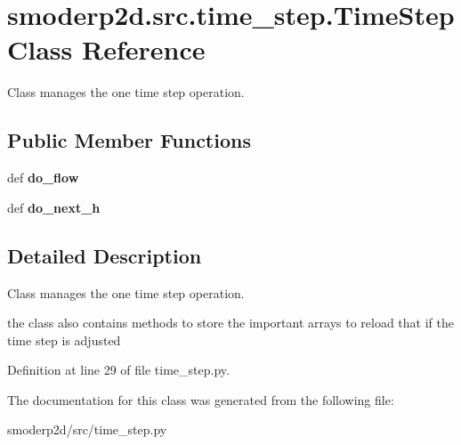 \hypertarget{classsmoderp2d_1_1src_1_1time__step_1_1TimeStep}{\section{smoderp2d.\-src.\-time\-\_\-step.\-Time\-Step Class Reference}
\label{classsmoderp2d_1_1src_1_1time__step_1_1TimeStep}
}


Class manages the one time step operation.  


\subsection*{Public Member Functions}
\begin{DoxyCompactItemize}
\item 
\hypertarget{classsmoderp2d_1_1src_1_1time__step_1_1TimeStep_ae256e735639ddea75ec60804b91d8d7a}{def {\bfseries do\-\_\-flow}}\label{classsmoderp2d_1_1src_1_1time__step_1_1TimeStep_ae256e735639ddea75ec60804b91d8d7a}

\item 
\hypertarget{classsmoderp2d_1_1src_1_1time__step_1_1TimeStep_af9c42120993834afb4318d35cbedd47e}{def {\bfseries do\-\_\-next\-\_\-h}}\label{classsmoderp2d_1_1src_1_1time__step_1_1TimeStep_af9c42120993834afb4318d35cbedd47e}

\end{DoxyCompactItemize}


\subsection{Detailed Description}
Class manages the one time step operation. 

the class also contains methods to store the important arrays to reload that if the time step is adjusted 

Definition at line 29 of file time\-\_\-step.\-py.



The documentation for this class was generated from the following file\-:\begin{DoxyCompactItemize}
\item 
smoderp2d/src/time\-\_\-step.\-py\end{DoxyCompactItemize}
